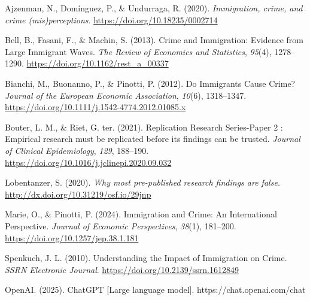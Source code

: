 \documentclass[
  man,
  floatsintext,
  longtable,
  nolmodern,
  notxfonts,
  notimes,
  colorlinks=true,linkcolor=blue,citecolor=blue,urlcolor=blue]{apa7}
\newlength{\cslhangindent}
\newenvironment{CSLReferences}[2] %
 {\begin{list}{}{%
  \setlength{\itemindent}{0pt}
  \setlength{\leftmargin}{0pt}
  \setlength{\parsep}{0pt}
  \ifodd #1
   \setlength{\leftmargin}{\cslhangindent}
   \setlength{\itemindent}{-1\cslhangindent}
  \fi
  \setlength{\itemsep}{#2\baselineskip}}}
 {\end{list}}
\begin{document}
\label{refs}
\begin{CSLReferences}{1}{0}
Ajzenman, N., Domínguez, P., \& Undurraga, R. (2020). \emph{Immigration,
crime, and crime (mis)perceptions}.
\url{https://doi.org/10.18235/0002714}

Bell, B., Fasani, F., \& Machin, S. (2013). Crime and Immigration:
Evidence from Large Immigrant Waves. \emph{The Review of Economics and
Statistics}, \emph{95}(4), 1278--1290.
\url{https://doi.org/10.1162/rest_a_00337}

Bianchi, M., Buonanno, P., \& Pinotti, P. (2012). Do Immigrants Cause
Crime? \emph{Journal of the European Economic Association},
\emph{10}(6), 1318--1347.
\url{https://doi.org/10.1111/j.1542-4774.2012.01085.x}

Bouter, L. M., \& Riet, G. ter. (2021). Replication Research
Series-Paper 2 : Empirical research must be replicated before its
findings can be trusted. \emph{Journal of Clinical Epidemiology},
\emph{129}, 188--190.
\url{https://doi.org/10.1016/j.jclinepi.2020.09.032}

Lobentanzer, S. (2020). \emph{Why most pre-published research findings
are false.} \url{http://dx.doi.org/10.31219/osf.io/29jnp}

Marie, O., \& Pinotti, P. (2024). Immigration and Crime: An
International Perspective. \emph{Journal of Economic Perspectives},
\emph{38}(1), 181--200. \url{https://doi.org/10.1257/jep.38.1.181}

Spenkuch, J. L. (2010). Understanding the Impact of Immigration on
Crime. \emph{SSRN Electronic Journal}.
\url{https://doi.org/10.2139/ssrn.1612849}

\end{CSLReferences}

OpenAI. (2025). ChatGPT {[}Large language model{]}.
https://chat.openai.com/chat

\appendix

\section{}\label{}

\section{}\label{apx-a}
\end{document}
